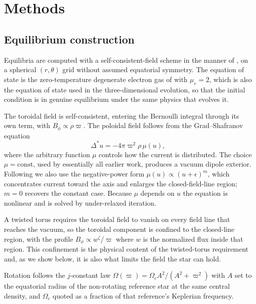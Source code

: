 \documentclass[twocolumn,linenumbers]{aastex701}
\begin{document}
\section{Methods} \label{sec:methods}

\subsection{Equilibrium construction}


Equilibria are computed with a self-consistent-field scheme in the manner of
\citet{hachisu1986}, on a spherical $(r,\theta)$ grid without assumed
equatorial symmetry. The equation of state is the zero-temperature degenerate
electron gas of \citet{chandrasekhar1935} with $\mu_e = 2$, which is also the
equation of state used in the three-dimensional evolution, so that the initial
condition is in genuine equilibrium under the same physics that evolves it.

The toroidal field is self-consistent, entering the Bernoulli integral through
its own term, with $B_\phi \propto \rho\varpi$. The poloidal field follows
from the Grad--Shafranov equation
\begin{equation}
\Delta^{*} u = -4\pi \varpi^{2} \rho\, \mu(u),
\end{equation}
where the arbitrary function $\mu$ controls how the current is distributed.
The choice $\mu = \mathrm{const}$, used by essentially all earlier work,
produces a vacuum dipole exterior. Following \citet{fujisawa2012} we also use
the negative-power form $\mu(u) \propto (u+\epsilon)^{m}$, which concentrates
current toward the axis and enlarges the closed-field-line region; $m=0$
recovers the constant case. Because $\mu$ depends on $u$ the equation is
nonlinear and is solved by under-relaxed iteration.

A twisted torus requires the toroidal field to vanish on every field line that
reaches the vacuum, so the toroidal component is confined to the closed-line
region, with the profile $B_\phi \propto w^{\zeta}/\varpi$ where
$w$ is the normalized flux inside that region. This confinement is the
physical content of the twisted-torus requirement and, as we show below, it is
also what limits the field the star can hold.

Rotation follows the $j$-constant law
$\Omega(\varpi) = \Omega_c A^2/(A^2+\varpi^2)$ with $A$ set to the equatorial
radius of the non-rotating reference star at the same central density, and
$\Omega_c$ quoted as a fraction of that reference's Keplerian frequency.
\end{document}
